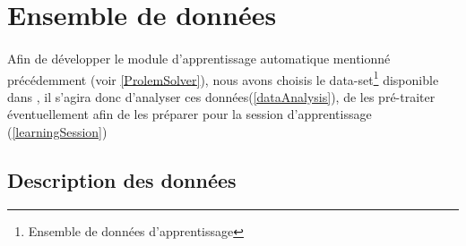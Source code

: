 
\section{Ensemble de données}
\paragraph{}
Afin de développer le module d'apprentissage automatique mentionné précédemment (voir \ref{ProlemSolver}), nous avons choisis le data-set\footnote{Ensemble de données d'apprentissage} disponible dans \cite{dataset}, il s'agira donc d'analyser ces données(\ref{dataAnalysis}), de les pré-traiter éventuellement afin de les préparer pour la session d'apprentissage (\ref{learningSession})
\subsection{Description des données}
